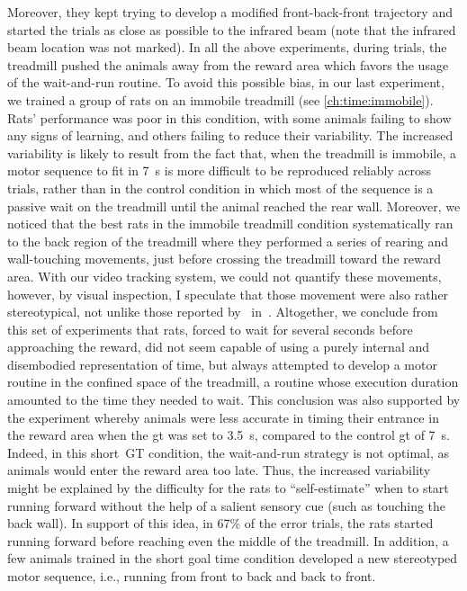 Moreover, they kept trying to develop a modified front-back-front trajectory and started the trials as close as possible to the infrared beam (note that the infrared beam location was not marked).
In all the above experiments, during trials, the treadmill pushed the animals away from the reward area which favors the usage of the wait-and-run routine.
To avoid this possible bias, in our last experiment, we trained a group of rats on an immobile treadmill (see \autoref{ch:time:immobile}).
Rats' performance was poor in this condition, with some animals failing to show any signs of learning, and others failing to reduce their variability.
The increased variability is likely to result from the fact that, when the treadmill is immobile, a motor sequence to fit in 7~s is more difficult to be reproduced reliably across trials, rather than in the control condition in which most of the sequence is a passive wait on the treadmill until the animal reached the rear wall.
Moreover, we noticed that the best rats in the immobile treadmill condition systematically ran to the back region of the treadmill where they performed a series of rearing and wall-touching movements, just before crossing the treadmill toward the reward area.
With our video tracking system, we could not quantify these movements, however, by visual inspection, I speculate that those movement were also rather stereotypical, not unlike those reported by~\citeauthor{Kawai2015} in~\cite{Kawai2015}.
Altogether, we conclude from this set of experiments that rats, forced to wait for several seconds before approaching the reward, did not seem capable of using a purely internal and disembodied representation of time, but always attempted to develop a motor routine in the confined space of the treadmill, a routine whose execution duration amounted to the time they needed to wait.
This conclusion was also supported by the experiment whereby animals were less accurate in timing their entrance in the reward area when the \gls{gt} was set to 3.5~s, compared to the control \gls{gt} of 7~s.
Indeed, in this short~GT condition, the wait-and-run strategy is not optimal, as animals would enter the reward area too late.
Thus, the increased variability might be explained by the difficulty for the rats to ``self-estimate'' when to start running forward without the help of a salient sensory cue (such as touching the back wall).
In support of this idea, in 67\% of the error trials, the rats started running forward before reaching even the middle of the treadmill.
In addition, a few animals trained in the short goal time condition developed a new stereotyped motor sequence, i.e., running from front to back and back to front.
